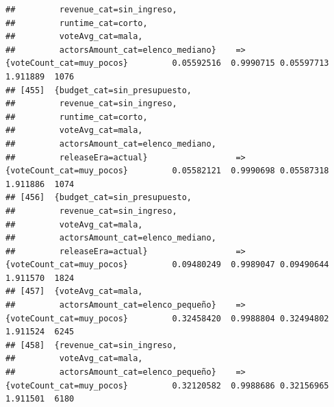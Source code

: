 \documentclass[
]{article}
\begin{document}
\begin{verbatim}
##         revenue_cat=sin_ingreso,                                                                                                
##         runtime_cat=corto,                                                                                                      
##         voteAvg_cat=mala,                                                                                                       
##         actorsAmount_cat=elenco_mediano}    => {voteCount_cat=muy_pocos}         0.05592516  0.9990715 0.05597713 1.911889  1076
## [455]  {budget_cat=sin_presupuesto,                                                                                             
##         revenue_cat=sin_ingreso,                                                                                                
##         runtime_cat=corto,                                                                                                      
##         voteAvg_cat=mala,                                                                                                       
##         actorsAmount_cat=elenco_mediano,                                                                                        
##         releaseEra=actual}                  => {voteCount_cat=muy_pocos}         0.05582121  0.9990698 0.05587318 1.911886  1074
## [456]  {budget_cat=sin_presupuesto,                                                                                             
##         revenue_cat=sin_ingreso,                                                                                                
##         voteAvg_cat=mala,                                                                                                       
##         actorsAmount_cat=elenco_mediano,                                                                                        
##         releaseEra=actual}                  => {voteCount_cat=muy_pocos}         0.09480249  0.9989047 0.09490644 1.911570  1824
## [457]  {voteAvg_cat=mala,                                                                                                       
##         actorsAmount_cat=elenco_pequeño}    => {voteCount_cat=muy_pocos}         0.32458420  0.9988804 0.32494802 1.911524  6245
## [458]  {revenue_cat=sin_ingreso,                                                                                                
##         voteAvg_cat=mala,                                                                                                       
##         actorsAmount_cat=elenco_pequeño}    => {voteCount_cat=muy_pocos}         0.32120582  0.9988686 0.32156965 1.911501  6180

\end{verbatim}
\end{document}
